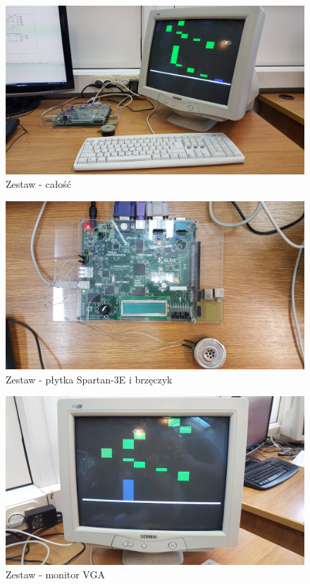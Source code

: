 \documentclass[a4paper]{report}
\begin{document}
	\begin{figure}[h!]
				\centering
				\includegraphics[width=1.0\textwidth]{zestaw_calosc.jpg}
				\caption{Zestaw - całość}
	\end{figure}	
	
	\begin{figure}[h!]
				\centering
				\includegraphics[width=1.0\textwidth]{zestaw_plytka_i_glosniczek2.jpg}
				\caption{Zestaw - płytka Spartan-3E i brzęczyk}
	\end{figure}	
	
	\begin{figure}[h!]
				\centering
				\includegraphics[width=1.0\textwidth]{zestaw_monitor3.jpg}
				\caption{Zestaw - monitor VGA}
	\end{figure}	
	
\end{document}
